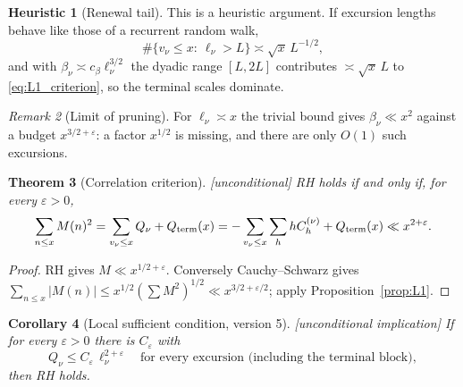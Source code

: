 \documentclass[11pt]{amsart}
\numberwithin{equation}{section}
\theoremstyle{plain}
\newtheorem{theorem}{Theorem}[section]
\newtheorem{corollary}[theorem]{Corollary}
\theoremstyle{definition}
\newtheorem{heuristic}[theorem]{Heuristic}
\theoremstyle{remark}
\newtheorem{remark}[theorem]{Remark}
\newcommand{\eps}{\varepsilon}
\begin{document}
\begin{heuristic}[Renewal tail]
\label{heu:renewal}
This is a heuristic argument. If excursion lengths behave like those of a
recurrent random walk,
\begin{equation}
\label{eq:renewal_tail}
  \#\{v_\nu\le x:\ \ell_\nu>L\}\asymp\sqrt{x}\,L^{-1/2},
\end{equation}
and with $\beta_\nu\asymp c_\beta\ell_\nu^{3/2}$ the dyadic range
$[L,2L]$ contributes $\asymp\sqrt{x}\,L$ to \eqref{eq:L1_criterion}, so the
terminal scales dominate.
\end{heuristic}

\begin{remark}[Limit of pruning]
\label{rem:pruning_limit}
For $\ell_\nu\asymp x$ the trivial bound gives $\beta_\nu\ll x^2$ against a
budget $x^{3/2+\eps}$: a factor $x^{1/2}$ is missing, and there are only
$O(1)$ such excursions.
\end{remark}

\begin{theorem}[Correlation criterion]
\label{thm:corr-criterion}
\emph{[unconditional]} RH holds if and only if, for every $\eps>0$,
\begin{equation}
\label{eq:RH-corr}
  \sum_{n\le x}M(n)^2=\sum_{v_\nu\le x}Q_\nu+Q_{\rm term}(x)
  =-\sum_{v_\nu\le x}\sum_{h}hC^{(\nu)}_h+Q_{\rm term}(x)\ll x^{2+\eps}.
\end{equation}
\end{theorem}

\begin{proof}
RH gives $M\ll x^{1/2+\eps}$. Conversely Cauchy--Schwarz gives
$\sum_{n\le x}|M(n)|\le x^{1/2}(\sum M^2)^{1/2}\ll x^{3/2+\eps/2}$; apply
Proposition~\ref{prop:L1}.
\end{proof}

\begin{corollary}[Local sufficient condition, version 5]
\label{cor:local-corr-sufficient}
\emph{[unconditional implication]} If for every $\eps>0$ there is
$C_\eps$ with
\begin{equation}
\label{eq:local_Q}
  Q_\nu\le C_\eps\,\ell_\nu^{2+\eps}\quad\text{for every excursion
  (including the terminal block)},
\end{equation}
then RH holds.
\end{corollary}
\end{document}
